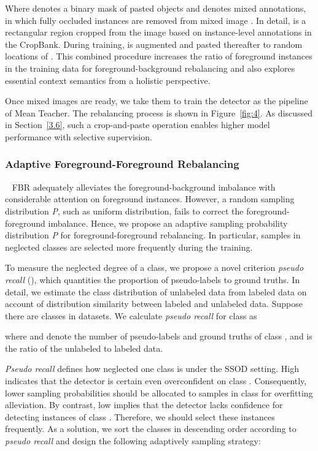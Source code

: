         
Where  denotes a binary mask of pasted objects and  denotes mixed annotations, in which fully occluded instances are removed from mixed image . In detail,  is a rectangular region cropped from the image based on instance-level annotations in the CropBank. During training,  is augmented and pasted thereafter to random locations of . This combined procedure increases the ratio of foreground instances in the training data for foreground-background rebalancing and also explores essential context semantics from a holistic perspective. 

Once mixed images are ready, we take them to train the detector as the pipeline of Mean Teacher. The rebalancing process is shown in Figure~\ref{fig:4}. As discussed in Section~\ref{3.6}, such a crop-and-paste operation enables higher model performance with selective supervision. 

\subsubsection{Adaptive Foreground-Foreground Rebalancing}\label{3.4.2}
\ 
\newline
FBR adequately alleviates the foreground-background imbalance with considerable attention on foreground instances. However, a random sampling distribution \emph{P}, such as uniform distribution, fails to correct the foreground-foreground imbalance. Hence, we propose an adaptive sampling probability distribution \emph{P} for foreground-foreground rebalancing. In particular, samples in neglected classes are selected more frequently during the training.

To measure the neglected degree of a class, we propose a novel criterion \emph{pseudo recall} (), which quantities the proportion of pseudo-labels to ground truths. In detail, we estimate the class distribution of unlabeled data from labeled data on account of distribution similarity between labeled and unlabeled data. Suppose there are  classes  in datasets. We calculate \emph{pseudo recall} for class  as
    
where  and  denote the number of pseudo-labels and ground truths of class , and  is the ratio of the unlabeled to labeled data. 

\emph{Pseudo recall} defines how neglected one class is under the SSOD setting. High  indicates that the detector is certain even overconfident on class . Consequently, lower sampling probabilities should be allocated to samples in class  for overfitting alleviation. By contrast, low  implies that the detector lacks confidence for detecting instances of class . Therefore, we should select these instances frequently. As a solution, we sort the classes in descending order according to \emph{pseudo recall} and design the following adaptively sampling strategy:
    
